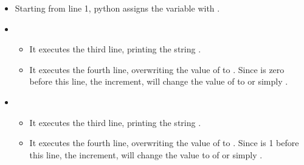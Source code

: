 \documentclass[letterpaper,10pt,english]{jupyterBook}
\begin{document}
\begin{itemize}
\item {} 
\sphinxAtStartPar
Starting from line 1, python assigns the variable  with .

\item {} 
\sphinxAtStartPar
{}
\begin{itemize}
\item {} 
\sphinxAtStartPar
It executes the third line, printing the string .

\item {} 
\sphinxAtStartPar
It executes the fourth line, overwriting the value of  to . Since  is zero before this line, the increment, will change the value of  to  or simply .

\end{itemize}

\item {} 
\sphinxAtStartPar
{}
\begin{itemize}
\item {} 
\sphinxAtStartPar
It executes the third line, printing the string .

\item {} 
\sphinxAtStartPar
It executes the fourth line, overwriting the value of  to . Since  is 1 before this line, the increment, will change the value to  of  or simply .

\end{itemize}


\end{itemize}
\end{document}
